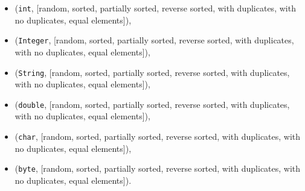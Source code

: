 \documentclass{article}
\begin{document}
\begin{itemize}
    \item (\texttt{int}, [random, sorted, partially sorted, reverse sorted, with duplicates, with no duplicates, equal elements]),
    \item (\texttt{Integer}, [random, sorted, partially sorted, reverse sorted, with duplicates, with no duplicates, equal elements]),
    \item (\texttt{String}, [random, sorted, partially sorted, reverse sorted, with duplicates, with no duplicates, equal elements]),
    \item (\texttt{double}, [random, sorted, partially sorted, reverse sorted, with duplicates, with no duplicates, equal elements]),
    \item (\texttt{char}, [random, sorted, partially sorted, reverse sorted, with duplicates, with no duplicates, equal elements]),
    \item (\texttt{byte}, [random, sorted, partially sorted, reverse sorted, with duplicates, with no duplicates, equal elements]).
\end{itemize}
\end{document}
